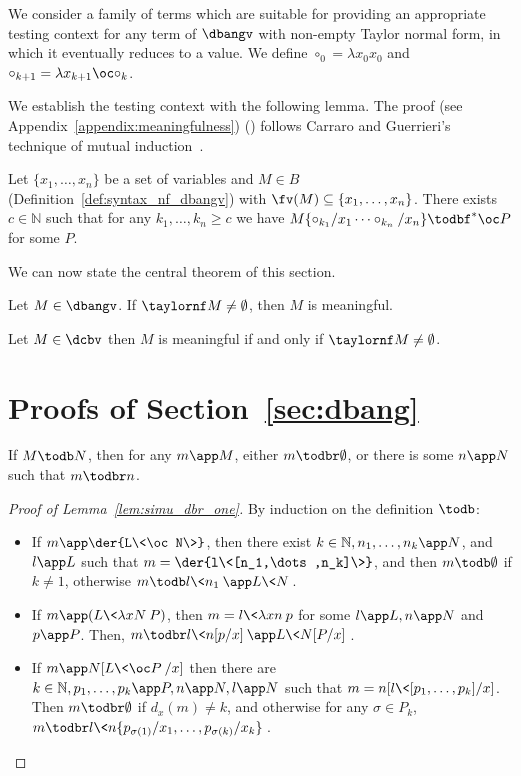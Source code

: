We consider a family of terms which are
suitable for providing an appropriate testing context for any term of $\dbangv$
with non-empty Taylor normal form, in which it eventually reduces to a value. We define
$\circ_0=\lambda x_0x_0$ and $\circ_{k+1}=\lambda x_{k+1}\oc\circ_k$.

We establish the testing context with the following lemma. The proof 
\iflong (see Appendix~\ref{appendix:meaningfulness}) 
\else (\cite{chardonnet2026approximationtheorydistantbang})
\fi
follows Carraro and Guerrieri's
technique of mutual induction~\cite[Lemmas 26 and 27]{CG14}.

\begin{lemma}\label{lem:mutual1}
	Let $\{x_1,\dots ,x_n\}$ be a set of variables and $M\in B$ 
	(Definition~\ref{def:syntax_nf_dbangv})
	with
	$\fv(M)\subseteq\{x_1,\dots ,x_n\}$. There exists $c\in\mathbb N$ such
	that for any $k_1,\dots ,k_n\geq c$ we have
	$M\{\circ_{k_1}/x_1\dots \circ_{k_n}/x_n\}\todbf^* \oc P$ for some $P$.
\end{lemma}
We can now state the central theorem of this section. 
\begin{theorem}
	\label{thm:dbangv_tnf}
	Let $M\in\dbangv$. If $\taylornf M\neq \emptyset$, then $M$ is
	meaningful.
\end{theorem}


\begin{corollary}
	\label{cor:dcbv-meaningful-iff-taylor}
	Let $M\in\dcbv$ then $M$ is meaningful if and only if $\taylornf
	M\neq\emptyset$.
\end{corollary}

\appendix
\section{Proofs of Section~\ref{sec:dbang}}
\label{appendix:dbang}

\begin{lemma}\label{lem:simu_dbr_one}
	If $M\todb N$, then for any $m\app M$, either $m\todbr \emptyset$, or there is some $n\app N$ such
	that $m\todbr n$.
\end{lemma}

\begin{proof}[Proof of Lemma~\ref{lem:simu_dbr_one}]
	By induction on the definition $\todb$:
	\begin{itemize}
		\item If $m\app\der{L\<\oc N\>}$, then there exist $k\in\mathbb
			N, n_1,\dots ,n_k\app N$, and $l\app L$ such that
			$m=\der{l\<[n_1,\dots ,n_k]\>}$, and then $m\todb \emptyset$ if $k\neq
			1$, otherwise $m\todb l\<n_1\>\app L\<N\>$.
		\item If $m\app(L\<\lambda xN\>P)$, then $m=l\<\lambda xn\>p$
			for some $l\app L, n\app N$ and $p\app P$. Then,
			$m\todbr l\<n[p/x]\>\app L\<N[P/x]\>$.
		\item If $m\app N[L\<\oc P\>/x]$ then there are $k\in\mathbb N,
			p_1,\dots ,p_k\app P, n\app N,l\app N$ such that
			$m=n[l\<[p_1,\dots ,p_k]/x]$. Then $m\todbr \emptyset$ if $d_x(m)\neq
			k$, and otherwise for any $\sigma\in P_k$, $m\todbr
			l\<n\{p_{\sigma(1)}/x_1,\dots ,p_{\sigma(k)}/x_k\}\>$. \qedhere
	\end{itemize}
\end{proof}


